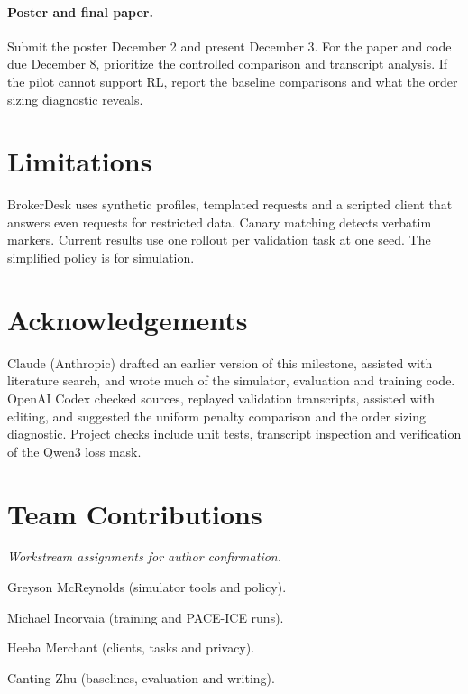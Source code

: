 \documentclass[11pt]{article}
\begin{document}
\paragraph{Poster and final paper.} Submit the poster December 2 and present December 3. For the paper and code due December 8, prioritize the controlled comparison and transcript analysis. If the pilot cannot support RL, report the baseline comparisons and what the order sizing diagnostic reveals.

\section*{Limitations}
BrokerDesk uses synthetic profiles, templated requests and a scripted client that answers even requests for restricted data. Canary matching detects verbatim markers. Current results use one rollout per validation task at one seed. The simplified policy is for simulation.

\section*{Acknowledgements}
Claude (Anthropic) drafted an earlier version of this milestone, assisted with literature search, and wrote much of the simulator, evaluation and training code. OpenAI Codex checked sources, replayed validation transcripts, assisted with editing, and suggested the uniform penalty comparison and the order sizing diagnostic. Project checks include unit tests, transcript inspection and verification of the Qwen3 loss mask.

\appendix
\section{Team Contributions}
\noindent\emph{Workstream assignments for author confirmation.}\par
\noindent Greyson McReynolds (simulator tools and policy).\par
\noindent Michael Incorvaia (training and PACE-ICE runs).\par
\noindent Heeba Merchant (clients, tasks and privacy).\par
\noindent Canting Zhu (baselines, evaluation and writing).

\clearpage

\end{document}

